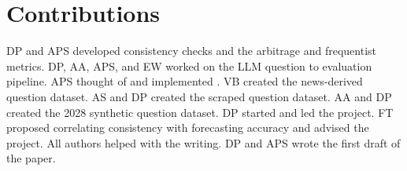 %


\section*{Contributions}
\label{cfc/app:contributions}

DP and APS developed consistency checks and the arbitrage and frequentist metrics.
DP, AA, APS, and EW worked on the LLM question to evaluation pipeline.
APS thought of and implemented \CFCaster{}.
VB created the news-derived question dataset.
AS and DP created the scraped question dataset.
AA and DP created the 2028 synthetic question dataset.
DP started and led the project.
FT proposed correlating consistency with forecasting accuracy and advised the project.
All authors helped with the writing.
DP and APS wrote the first draft of the paper.


